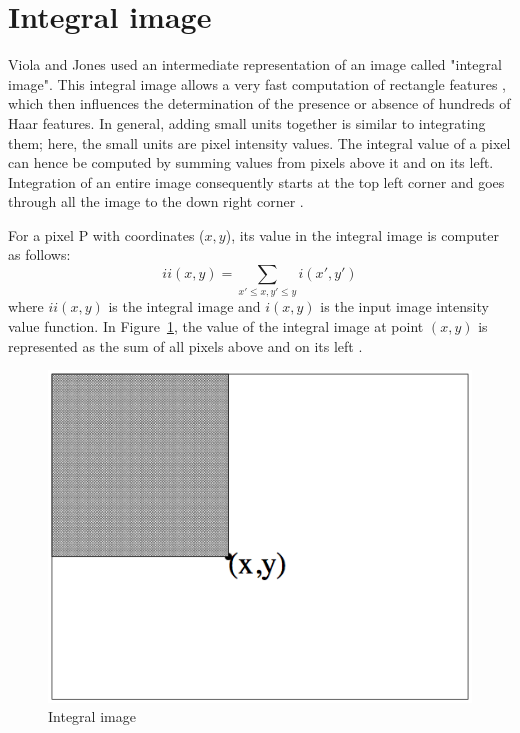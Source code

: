 \section{Integral image}

\vspace{\baselineskip}
\noindent Viola and Jones used an intermediate representation of an image called "integral image". This integral image allows a very fast computation of rectangle features \cite{VIO01}, which then influences the determination of the presence or absence of hundreds of Haar features. In general, adding small units together is similar to integrating them; here, the small units are pixel intensity values. The integral value of a pixel can hence be computed by summing values from pixels above it and on its left. Integration of an entire image consequently starts at the top left corner and goes through all the image to the down right corner \cite{HEW07}.
\newline

\noindent For a pixel P with coordinates ($x,y$), its value in the integral image is computer as follows: \[ ii(x,y) = \sum_{x' \leq x,y' \leq y} i(x',y') \] where $ ii(x,y) $ is the integral image and $ i(x,y) $ is the input image intensity value function. In Figure~\ref{integral_image_description}, the value of the integral image at point $ (x,y) $ is represented as the sum of all pixels above and on its left \cite{VIO01}. 
\newline
	
\begin{figure}[!h]
\begin{center}
\noindent \includegraphics[scale=0.5]{figures/integral_image_description} 
\newline
\caption{Integral image}
\label{integral_image_description}
\end{center} 
\end{figure}
	
